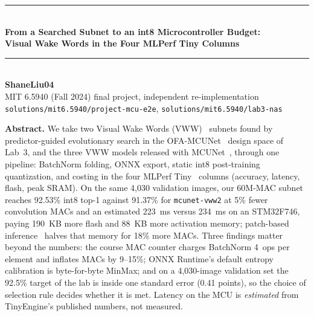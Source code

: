 \documentclass[10pt,letterpaper]{article}
\begin{document}
\begin{center}
\rule{\textwidth}{4pt}\\[0.6em]
{\LARGE\bfseries From a Searched Subnet to an int8 Microcontroller Budget:\\[0.2em]
Visual Wake Words in the Four MLPerf Tiny Columns}\\[0.5em]
\rule{\textwidth}{1pt}\\[1.0em]
{\bfseries ShaneLiu04}\\
MIT 6.5940 (Fall 2024) final project, independent re-implementation\\
\texttt{solutions/mit6.5940/project-mcu-e2e}, \texttt{solutions/mit6.5940/lab3-nas}
\end{center}
\vspace{0.4em}

\begin{center}\begin{minipage}{0.88\textwidth}
\small\textbf{Abstract.}
We take two Visual Wake Words (VWW)~\cite{vww} subnets found by predictor-guided evolutionary search in the OFA-MCUNet~\cite{ofa} design space of Lab~3, and the three VWW models released with MCUNet~\cite{mcunet}, through one pipeline: BatchNorm folding, ONNX export, static int8 post-training quantization, and costing in the four MLPerf Tiny~\cite{mlperftiny} columns (accuracy, latency, flash, peak SRAM).
On the same 4,030 validation images, our 60M-MAC subnet reaches 92.53\% int8 top-1 against 91.37\% for \texttt{mcunet-vww2} at 5\% fewer convolution MACs and an estimated 223~ms versus 234~ms on an STM32F746, paying 190~KB more flash and 88~KB more activation memory; patch-based inference~\cite{mcunetv2} halves that memory for 18\% more MACs.
Three findings matter beyond the numbers: the course MAC counter charges BatchNorm 4~ops per element and inflates MACs by 9--15\%; ONNX Runtime's default entropy calibration is byte-for-byte MinMax; and on a 4,030-image validation set the 92.5\% target of the lab is inside one standard error (0.41 points), so the choice of selection rule decides whether it is met.
Latency on the MCU is \emph{estimated} from TinyEngine's published numbers, not measured.
\end{minipage}\end{center}
\end{document}
